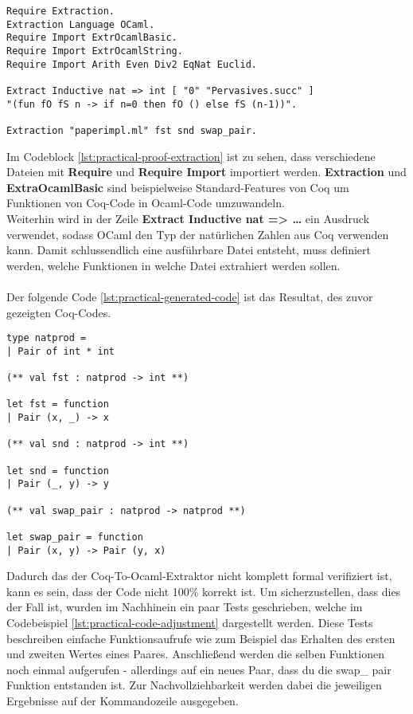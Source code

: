 \begin{lstlisting}[language=coq,firstnumber=1,caption=Coq Code extrahieren,label=lst:practical-proof-extraction]
Require Extraction.
Extraction Language OCaml.
Require Import ExtrOcamlBasic.
Require Import ExtrOcamlString.
Require Import Arith Even Div2 EqNat Euclid.

Extract Inductive nat => int [ "0" "Pervasives.succ" ]
"(fun fO fS n -> if n=0 then fO () else fS (n-1))".

Extraction "paperimpl.ml" fst snd swap_pair.
\end{lstlisting}
Im Codeblock \ref{lst:practical-proof-extraction} ist zu sehen, dass verschiedene Dateien mit \textbf{Require} und \textbf{Require Import} importiert werden. \textbf{Extraction} und \textbf{ExtraOcamlBasic} sind beispielweise Standard-Features von Coq um Funktionen von Coq-Code in Ocaml-Code umzuwandeln.\\
Weiterhin wird in der Zeile \textbf{Extract Inductive nat => \dots} ein Ausdruck verwendet, sodass OCaml den Typ der natürlichen Zahlen aus Coq verwenden kann.
Damit schlussendlich eine ausführbare Datei entsteht, muss definiert werden, welche Funktionen in welche Datei extrahiert werden sollen.\\
\\
Der folgende Code \ref{lst:practical-generated-code} ist das Resultat, des zuvor gezeigten Coq-Codes. 
\begin{lstlisting}[language=coq,firstnumber=1,caption=Ocaml Code anpassen,label=lst:practical-generated-code]
type natprod =
| Pair of int * int

(** val fst : natprod -> int **)

let fst = function
| Pair (x, _) -> x

(** val snd : natprod -> int **)

let snd = function
| Pair (_, y) -> y

(** val swap_pair : natprod -> natprod **)

let swap_pair = function
| Pair (x, y) -> Pair (y, x)
\end{lstlisting}
Dadurch das der Coq-To-Ocaml-Extraktor nicht komplett formal verifiziert ist, kann es sein, dass der Code nicht 100\% korrekt ist. Um sicherzustellen, dass dies der Fall ist, wurden im Nachhinein ein paar Tests geschrieben, welche im Codebeispiel \ref{lst:practical-code-adjustment} dargestellt werden. Diese Tests beschreiben einfache Funktionsaufrufe wie zum Beispiel das Erhalten des ersten und zweiten Wertes eines Paares. Anschließend werden die selben Funktionen noch einmal aufgerufen - allerdings auf ein neues Paar, dass du die swap\_	pair Funktion entstanden ist. Zur Nachvollziehbarkeit werden dabei die jeweiligen Ergebnisse auf der Kommandozeile ausgegeben.
